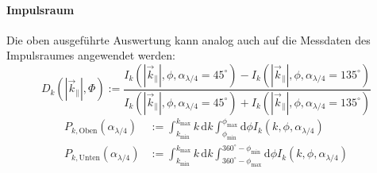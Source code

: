 \documentclass[titlepage,  ngerman]{article}
\begin{document}
		\paragraph{Impulsraum}
		Die oben ausgeführte Auswertung kann analog auch auf die Messdaten des Impulsraumes angewendet werden:
		\begin{equation}
			\label{eq:diff_measure_momentum}
			D_k\left(|\vec{k}_\parallel|, \Phi\right) := \dfrac{I_k(|\vec{k}_\parallel|, \phi, \alpha_{\lambda /4} = 45^\circ) - I_k(|\vec{k}_\parallel|, \phi, \alpha_{\lambda /4} = 135^\circ)}{I_k(|\vec{k}_\parallel|, \phi, \alpha_{\lambda /4} = 45^\circ) + I_k(|\vec{k}_\parallel|, \phi, \alpha_{\lambda /4} = 135^\circ)}
		\end{equation} 
		\begin{align}
			P_{k, \mathrm{Oben}}(\alpha_{\lambda/4}) &:= \int_{k_\mathrm{min}}^{k_\mathrm{max}}k \, \mathrm{d}k \int_{\phi_\mathrm{min}}^{\phi_\mathrm{max}} \mathrm{d}\phi I_k(k, \phi, \alpha_{\lambda /4}) \\
			\nonumber
			P_{k, \mathrm{Unten}}(\alpha_{\lambda/4}) &:= \int_{k_\mathrm{min}}^{k_\mathrm{max}}k \, \mathrm{d}k \int_{360^\circ -\phi_\mathrm{max}}^{360^\circ - \phi_\mathrm{min}} \mathrm{d}\phi I_k(k, \phi, \alpha_{\lambda/4})		 	
		\end{align}
		
\end{document}
